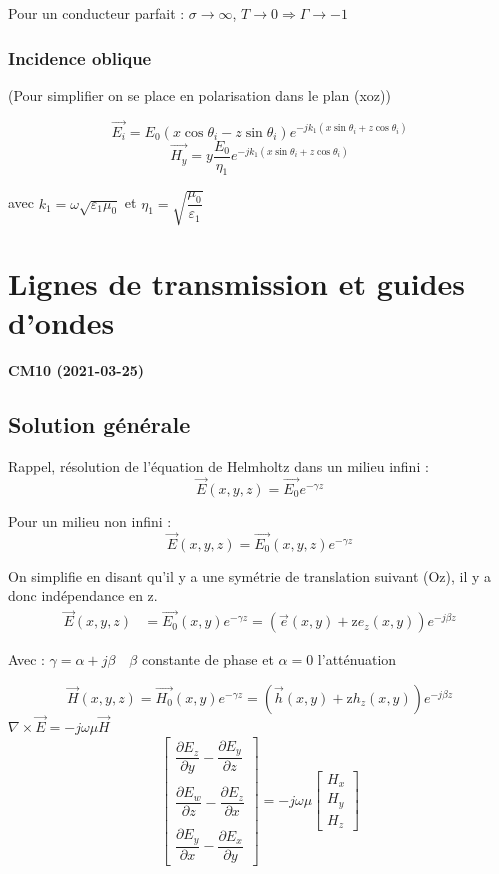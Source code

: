 \documentclass[12pt,a4paper]{report}
\begin{document}
Pour un conducteur parfait : \(\sigma \rightarrow \infty\), \(T \rightarrow 0 \Rightarrow \Gamma \rightarrow -1\)

\subsection{Incidence oblique}

(Pour simplifier on se place en polarisation dans le plan (xoz))

\[
	\vec{E_i} = E_0 ( x \cos \theta_i - z \sin \theta_i) e^{-jk_1 (x\sin\theta_i + z\cos\theta_i)}
\]
\[
	\vec{H_y} = y \dfrac{E_0}{\eta_1} e^{-jk_1 (x \sin \theta_i + z\cos \theta_i)}
\]

avec \(k_1 = \omega \sqrt{\varepsilon_1 \mu_0}\) et \(\eta_1 = \sqrt{\dfrac{\mu_0}{\varepsilon_1}}\)

\chapter{Lignes de transmission et guides d'ondes}

\begin{center}
\textbf{CM10 (2021-03-25)}
\end{center}

\section{Solution générale}

Rappel, résolution de l'équation de Helmholtz dans un milieu infini :
\[
	\vec{E}(x,y,z) = \vec{E_0}e^{-\gamma z} 
\]

Pour un milieu non infini : 
\[
	\vec{E}(x,y,z) = \vec{E_0}(x,y,z)e^{-\gamma z}
\]

On simplifie en disant qu'il y a une symétrie de translation suivant (Oz), il y a donc indépendance en z.
\begin{align*}
	\vec{E}(x,y,z) &= \vec{E_0}(x,y) e^{-\gamma z} = (\vec{e}(x,y) + \text{\^z} e_z (x,y))e^{-j\beta z}
\end{align*}

Avec : \(\gamma = \alpha + j\beta \quad \beta\) constante de phase et \(\alpha=0\) l'atténuation

\[
	\vec{H}(x,y,z) = \vec{H_0}(x,y) e^{-\gamma z}= (\vec{h} (x,y) + \text{\^z} h_z (x,y))e^{-j\beta z}
\]
\(\nabla \times \vec{E} = -j\omega \mu \vec{H}\)
\[
	\left[
	\begin{array}{c}
		\dfrac{\partial E_z}{\partial y} - \dfrac{\partial E_y}{\partial z}\\\\
		\dfrac{\partial E_w}{\partial z} - \dfrac{\partial E_z}{\partial x}\\\\
		\dfrac{\partial E_y}{\partial x} - \dfrac{\partial E_x}{\partial y}
	\end{array}
	\right]
	= -j\omega \mu
	\left[
	\begin{array}{c}
		H_x\\
		H_y\\
		H_z
	\end{array}
	 \right]
\]
\end{document}
